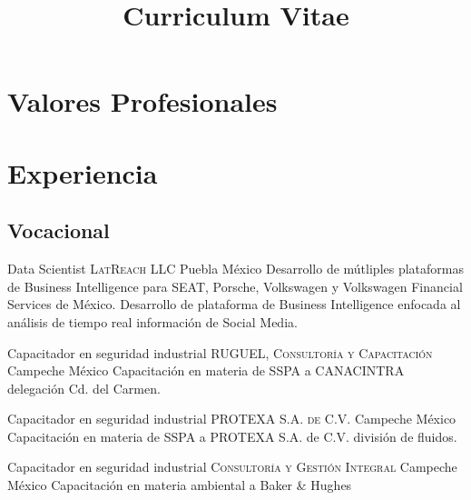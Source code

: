 \documentclass[11pt, letterpaper, roman]{moderncv}
\title{Curriculum Vitae}
\begin{document}
\makecvtitle

\section{Valores Profesionales}



\section{Experiencia}

\subsection{Vocacional}

		{Data Scientist}
		{\newline \textsc{LatReach LLC}}
		{Puebla}
		{México}
		{Desarrollo de mútliples plataformas de Business Intelligence para SEAT, Porsche,
        Volkswagen y Volkswagen Financial Services de México. Desarrollo de plataforma de
        Business Intelligence enfocada al análisis de tiempo real información de Social
        Media.}

		{Capacitador en seguridad industrial}
    	{\newline \textsc{RUGUEL, Consultoría y Capacitación}}
		{Campeche}
		{México}
		{Capacitación en materia de SSPA a CANACINTRA delegación Cd. del Carmen.}

		{Capacitador en seguridad industrial}
		{\newline \textsc{PROTEXA S.A. de C.V.}}
		{Campeche}
		{México}
		{Capacitación en materia de SSPA a PROTEXA S.A. de C.V. división de fluidos.}
		
		{Capacitador en seguridad industrial}
		{\newline \textsc{Consultoría y Gestión Integral}}
		{Campeche}
		{México}
		{Capacitación en materia ambiental a Baker \& Hughes}
		
\end{document}
